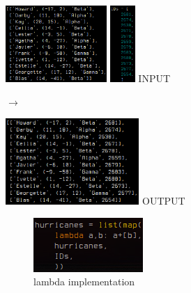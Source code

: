 \documentclass[12pt]{article}
\newcommand{\bna}[2]{
        \begin{minipage}[c]{.4\textwidth}
		\begin{center}
		\texttt{[image: \#1]}
		\textsc{INPUT}
		\end{center}
        \end{minipage}
	\begin{minipage}[c]{.1\textwidth}
		\center\LARGE$\longrightarrow$
	\end{minipage}
        \begin{minipage}[c]{.4\textwidth}
		\begin{center}
		\texttt{[image: \#2]}
		\textsc{OUTPUT}
		\end{center}
        \end{minipage}\vspace{.12in}
        }
\begin{document}
\begin{center}
	\begin{minipage}[c]{.4\textwidth}
		\begin{center}
		\includegraphics[height=110px]{./figures/3_lambda/in_lambda.png}
		\includegraphics[height=110px]{./figures/3_lambda/ids.png}
		\textsc{INPUT}
		\end{center}
	\end{minipage}
	\begin{minipage}[c]{.1\textwidth}
		\begin{center}
		\LARGE$\longrightarrow$
		\end{center}
	\end{minipage}
	\begin{minipage}[c]{.4\textwidth}
		\begin{center}
		\includegraphics[height=124px]{./figures/3_lambda/out_lambda.png}
		\textsc{OUTPUT}
		\end{center}
	\end{minipage}\vspace{.12in}
\end{center}


\begin{figure}
	\begin{center}
		\includegraphics[width=.38\textwidth]{./figures/3_lambda/codeblock_lambda.png}
		\caption{lambda implementation}
		\label{lambda code} %
	\end{center}
\end{figure}
\end{document}
